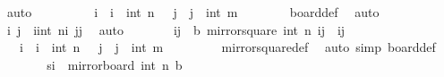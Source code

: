\begin{isabellebody}
\ auto\isanewline
\ \ \ \ \isamarkupfalse%
\ \isamarkupfalse%
\ {\isachardoublequoteopen}{}\ {\isasymle}\ i\ {\isasymand}\ i\ {\isasymle}\ int\ n{\isachardoublequoteclose}\ {\isachardoublequoteopen}{}\ {\isasymle}\ j\ {\isasymand}\ j\ {\isasymle}\ int\ m{\isachardoublequoteclose}\isanewline
\ \ \ \ \ \ \isamarkupfalse%
\ board{\isacharunderscore}{\kern0pt}def\ \isamarkupfalse%
\ auto\isanewline
\ \ \ \ \isamarkupfalse%
\ \isamarkupfalse%
\ i{\isacharprime}{\kern0pt}\ j{\isacharprime}{\kern0pt}\ \ {\isachardoublequoteopen}i{\isacharprime}{\kern0pt}{\isacharequal}{\kern0pt}{\isacharparenleft}{\kern0pt}int\ n{\isacharplus}{\kern0pt}{}{\isacharparenright}{\kern0pt}{\isacharminus}{\kern0pt}i{\isachardoublequoteclose}\ {\isachardoublequoteopen}j{\isacharprime}{\kern0pt}{\isacharequal}{\kern0pt}j{\isachardoublequoteclose}\ \isamarkupfalse%
\ auto\isanewline
\ \ \ \ \isamarkupfalse%
\ \isamarkupfalse%
\ {\isachardoublequoteopen}{\isacharparenleft}{\kern0pt}i{\isacharprime}{\kern0pt}{\isacharcomma}{\kern0pt}j{\isacharprime}{\kern0pt}{\isacharparenright}{\kern0pt}\ {\isasymin}\ {\isacharquery}{\kern0pt}b{\isachardoublequoteclose}\ {\isachardoublequoteopen}mirror{}{\isacharunderscore}{\kern0pt}square\ {\isacharparenleft}{\kern0pt}int\ n{\isacharplus}{\kern0pt}{}{\isacharparenright}{\kern0pt}\ {\isacharparenleft}{\kern0pt}i{\isacharprime}{\kern0pt}{\isacharcomma}{\kern0pt}j{\isacharprime}{\kern0pt}{\isacharparenright}{\kern0pt}\ {\isacharequal}{\kern0pt}\ {\isacharparenleft}{\kern0pt}i{\isacharcomma}{\kern0pt}j{\isacharparenright}{\kern0pt}{\isachardoublequoteclose}\ \isanewline
\ \ \ \ \ \ \isamarkupfalse%
\ {\isacartoucheopen}{}\ {\isasymle}\ i\ {\isasymand}\ i\ {\isasymle}\ int\ n{\isacartoucheclose}\ {\isacartoucheopen}{}\ {\isasymle}\ j\ {\isasymand}\ j\ {\isasymle}\ int\ m{\isacartoucheclose}\ \isanewline
\ \ \ \ \ \ \isamarkupfalse%
\ mirror{}{\isacharunderscore}{\kern0pt}square{\isacharunderscore}{\kern0pt}def\ \isamarkupfalse%
\ {\isacharparenleft}{\kern0pt}auto\ simp{\isacharcolon}{\kern0pt}\ board{\isacharunderscore}{\kern0pt}def{\isacharparenright}{\kern0pt}\isanewline
\ \ \ \ \isamarkupfalse%
\ \isamarkupfalse%
\ {\isachardoublequoteopen}s\isactrlsub i\ {\isasymin}\ mirror{}{\isacharunderscore}{\kern0pt}board\ {\isacharparenleft}{\kern0pt}int\ n{\isacharplus}{\kern0pt}{}{\isacharparenright}{\kern0pt}\ {\isacharquery}{\kern0pt}b{\isachardoublequoteclose}\isanewline

\end{isabellebody}
